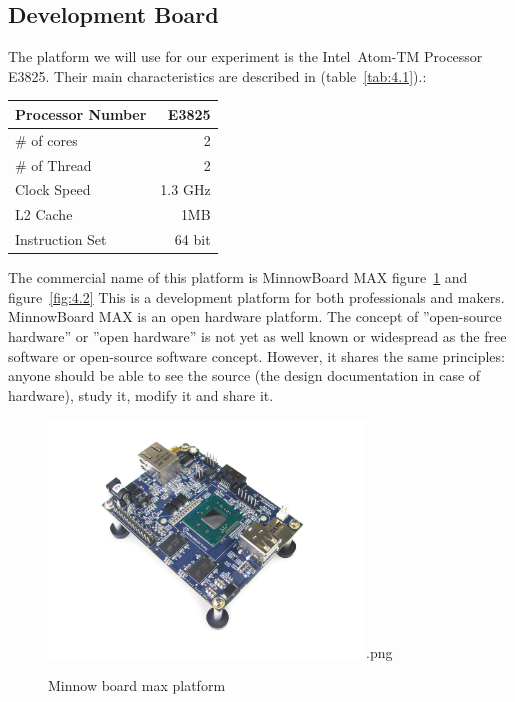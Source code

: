 \subsection{Development Board} The platform we will use for our experiment is the
Intel\textregistered\  Atom-TM Processor E3825. Their main characteristics are
described in (table~\ref{tab:4.1}).\cite{E3825}:

    \begin{center}
    \begin{tabular}{ | l | r |}
        \hline
        Processor Number & E3825  \\ \hline
        \# of cores & 2  \\ \hline
        \# of Thread & 2  \\ \hline
        Clock Speed & 1.3 GHz  \\ \hline
        L2 Cache & 1MB  \\ \hline
        Instruction Set & 64 bit  \\ \hline
    \end{tabular}
     \label{tab:4.1}
    \end{center}

The commercial name of this platform is  MinnowBoard MAX figure~\ref{fig:4.1}
and  figure~\ref{fig:4.2} This is a development platform for both
professionals and makers.  MinnowBoard MAX is an open hardware platform. The
concept of ''open-source hardware'' or ''open hardware'' is not yet as well
known or widespread as the free software or open-source software concept.
However, it shares the same principles: anyone should be able to see the source
(the design documentation in case of hardware), study it, modify it and share
it.

\begin{figure}[H]
\centering
\includegraphics[width=0.75\textwidth]{images/minnow-max.jpg}.png
\caption{Minnow board max platform}
\label{fig:4.1}
\end{figure}


